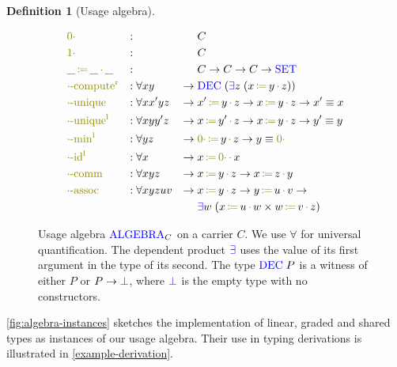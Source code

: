 \documentclass[sigplan,10pt,anonymous,review]{acmart}
\theoremstyle{definition}
\newtheorem{nidefinition}{Definition}
\newcommand{\type}[1]{\textcolor{blue}{\operatorname{#1}}}
\newcommand{\func}[1]{\textcolor{olive}{\operatorname{#1}}}
\newcommand{\op}[3]{#1 \, \func{\coloneqq} \, #2 \, \func{\cdot} \, #3}
\newcommand{\zero}{\func{0\cdot}}
\newcommand{\one}{\func{1\cdot}}
\newcommand{\Set}{\type{SET}}
\newcommand{\Algebra}{\type{ALGEBRA}}
\begin{document}
\begin{nidefinition}[Usage algebra]
  \begin{figure}[h]
  \begin{equation*}
  \begin{aligned}
    &\zero                   &:{} &                 &        & C \\
    &\one                    &:{} &                 &        & C \\
    &\op{\_}{\_}{\_}         &:{} &                 &        & C \to C \to C \to \Set \\
    &\func{\cdot-compute^r}  &:{} &\forall x y       & \to \; & \type{DEC} \; (\type{\exists} z  \; (\op{x}{y}{z})) \\
    &\func{\cdot-unique}     &:{} &\forall x x' y z  & \to \; & \op{x'}{y}{z} \to \op{x}{y}{z} \to x' \equiv x \\
    &\func{\cdot-unique^l}   &:{} &\forall x y y' z  & \to \; & \op{x}{y'}{z} \to \op{x}{y}{z} \to y' \equiv y \\
    &\func{\cdot-min^l}      &:{} &\forall y z        & \to \; & \op{\zero}{y}{z} \to y \equiv \zero \\
    &\func{\cdot-id^l}       &:{} &\forall x         & \to \; & \op{x}{\zero}{x} \\
    &\func{\cdot-comm}       &:{} &\forall x y z     & \to \; & \op{x}{y}{z} \to \op{x}{z}{y} \\
    &\func{\cdot-assoc}      &:{} &\forall x y z u v & \to \; & \op{x}{y}{z} \to \op{y}{u}{v} \to \\
    &                        &    &                  &        & \type{\exists} w  \; (\op{x}{u}{w} \times \op{w}{v}{z})
  \end{aligned}
  \end{equation*}
  \caption{
    Usage algebra $\Algebra_C$ on a carrier $C$.
    We use $\forall$ for universal quantification.
    The dependent product $\type{\exists}$ uses the value of its first argument in the type of its second.
    The type $\type{DEC} \; P$ is a witness of either $P$ or $P \to \type{\bot}$, where $\type{\bot}$ is the empty type with no constructors.
  }
  \label{fig:multiplicities}
  \end{figure}
\end{nidefinition}

\autoref{fig:algebra-instances} sketches the implementation of linear, graded and shared types as instances of our usage algebra.
Their use in typing derivations is illustrated in \autoref{example-derivation}.
\end{document}
